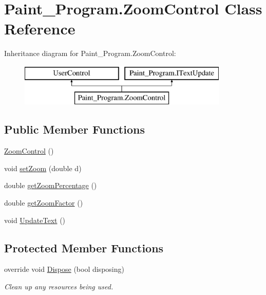 \hypertarget{class_paint___program_1_1_zoom_control}{}\section{Paint\+\_\+\+Program.\+Zoom\+Control Class Reference}
\label{class_paint___program_1_1_zoom_control}
Inheritance diagram for Paint\+\_\+\+Program.\+Zoom\+Control\+:\begin{figure}[H]
\begin{center}
\leavevmode
\includegraphics[height=2.000000cm]{class_paint___program_1_1_zoom_control}
\end{center}
\end{figure}
\subsection*{Public Member Functions}
\begin{DoxyCompactItemize}
\item 
\mbox{\hyperlink{class_paint___program_1_1_zoom_control_a7cb51cc074675cf89ce6fd52bf42127a}{Zoom\+Control}} ()
\item 
void \mbox{\hyperlink{class_paint___program_1_1_zoom_control_a2a13fda8b393affa5dfca15d16ce93b8}{set\+Zoom}} (double d)
\item 
double \mbox{\hyperlink{class_paint___program_1_1_zoom_control_ab072d3d242a55e523f64264bd1feccc8}{get\+Zoom\+Percentage}} ()
\item 
double \mbox{\hyperlink{class_paint___program_1_1_zoom_control_a2e0d50a277a9bca1837ca8e11793ecfe}{get\+Zoom\+Factor}} ()
\item 
void \mbox{\hyperlink{class_paint___program_1_1_zoom_control_ab67ee2f3ff5a99c50279ac3b3602a523}{Update\+Text}} ()
\end{DoxyCompactItemize}
\subsection*{Protected Member Functions}
\begin{DoxyCompactItemize}
\item 
override void \mbox{\hyperlink{class_paint___program_1_1_zoom_control_af1161f20c4f21c1852577e26b58720f0}{Dispose}} (bool disposing)
\begin{DoxyCompactList}\small\item\em Clean up any resources being used. \end{DoxyCompactList}\end{DoxyCompactItemize}
